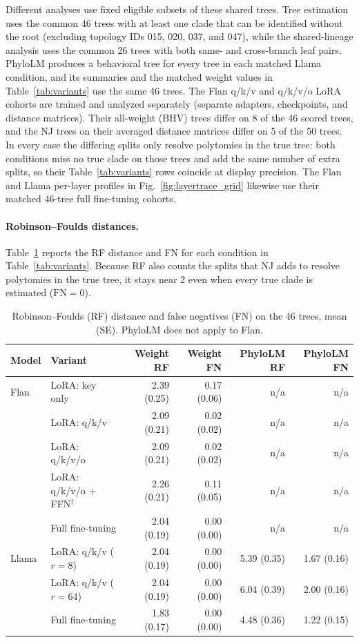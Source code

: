 \documentclass{article}
\theoremstyle{definition}
\theoremstyle{plain}
\begin{document}
Different analyses use fixed eligible subsets of these shared trees. Tree estimation uses the
common 46 trees with at least one clade that can be identified without the root (excluding topology IDs 015, 020,
037, and 047), while the shared-lineage analysis uses the common 26 trees with both same- and cross-branch leaf pairs. PhyloLM produces a behavioral tree for every tree in each matched Llama
condition, and its summaries and the matched weight values in
Table~\ref{tab:variants} use the same 46 trees. The Flan q/k/v and q/k/v/o LoRA cohorts are
trained and analyzed separately (separate adapters, checkpoints, and distance matrices). Their
all-weight (BHV) trees differ on 8 of the 46 scored trees, and the NJ trees on their averaged distance
matrices differ on 5 of the 50 trees. In every case the differing splits only resolve polytomies in the true
tree: both conditions miss no true clade on those trees and add the same number of extra splits, so their
Table~\ref{tab:variants} rows coincide at display precision. The Flan and Llama per-layer profiles
in Fig.~\ref{fig:layertrace_grid} likewise use their matched 46-tree full fine-tuning cohorts.

\paragraph{Robinson--Foulds distances.}\label{app:rf}
Table~\ref{tab:rf} reports the RF distance and FN for each condition in Table~\ref{tab:variants}. Because RF also counts the splits that NJ adds to resolve polytomies in the true tree, it stays near 2 even when every true clade is estimated ($\mathrm{FN}=0$).

\begin{table}[h]
\caption{Robinson--Foulds (RF) distance and false negatives (FN) on the 46 trees, mean (SE). PhyloLM does not apply to Flan.}
\label{tab:rf}
\centering
\scriptsize
\begin{tabular}{llrrrr}
\toprule
Model & Variant & Weight RF & Weight FN & PhyloLM RF & PhyloLM FN \\
\midrule
Flan & LoRA: key only                   & 2.39 (0.25) & 0.17 (0.06) & n/a & n/a \\
     & LoRA: q/k/v                      & 2.09 (0.21) & 0.02 (0.02) & n/a & n/a \\
     & LoRA: q/k/v/o                    & 2.09 (0.21) & 0.02 (0.02) & n/a & n/a \\
     & LoRA: q/k/v/o + FFN$^\dagger$    & 2.26 (0.21) & 0.11 (0.05) & n/a & n/a \\
     & Full fine-tuning                 & 2.04 (0.19) & 0.00 (0.00) & n/a & n/a \\
\midrule
Llama & LoRA: q/k/v ($r{=}8$)          & 2.04 (0.19) & 0.00 (0.00) & 5.39 (0.35) & 1.67 (0.16) \\
      & LoRA: q/k/v ($r{=}64$)         & 2.04 (0.19) & 0.00 (0.00) & 6.04 (0.39) & 2.00 (0.16) \\
      & Full fine-tuning                & 1.83 (0.17) & 0.00 (0.00) & 4.48 (0.36) & 1.22 (0.15) \\
\bottomrule
\end{tabular}
\end{table}
\end{document}
